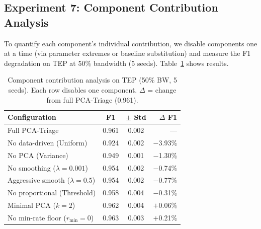 \documentclass[journal]{IEEEtran}
\begin{document}
\subsection{Experiment 7: Component Contribution Analysis}

To quantify each component's individual contribution, we disable components one at a time (via parameter extremes or baseline substitution) and measure the F1 degradation on TEP at 50\% bandwidth (5 seeds). Table~\ref{tab:component} shows results.

\begin{table}[t]
\centering
\caption{Component contribution analysis on TEP (50\% BW, 5 seeds). Each row disables one component. $\Delta$ = change from full PCA-Triage (0.961).}
\begin{tabular}{@{}lccr@{}}
\toprule
\textbf{Configuration} & \textbf{F1} & \textbf{$\pm$ Std} & \textbf{$\Delta$ F1} \\
\midrule
Full PCA-Triage & 0.961 & 0.002 & --- \\
\midrule
No data-driven (Uniform) & 0.924 & 0.002 & $-$3.93\% \\
No PCA (Variance) & 0.949 & 0.001 & $-$1.30\% \\
No smoothing ($\lambda{=}0.001$) & 0.954 & 0.002 & $-$0.74\% \\
Aggressive smooth ($\lambda{=}0.5$) & 0.954 & 0.002 & $-$0.77\% \\
No proportional (Threshold) & 0.958 & 0.004 & $-$0.31\% \\
Minimal PCA ($k{=}2$) & 0.962 & 0.004 & $+$0.06\% \\
No min-rate floor ($r_{\min}{=}0$) & 0.963 & 0.003 & $+$0.21\% \\
\bottomrule
\end{tabular}
\label{tab:component}
\end{table}
\end{document}
